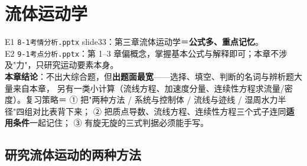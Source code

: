 \chapter{流体运动学}

\begin{yijubox}
E1 \texttt{8-1考情分析.pptx} slide33：第三章流体运动学＝\textbf{公式多、重点记忆}。\\
E2 \texttt{9-1考点分析.pptx}：第 1--3 章偏概念，掌握基本公式与解释即可；本章不涉及"力"，只研究运动要素本身。\\
\textbf{本章结论}：不出大综合题，但\textbf{出题面最宽}——选择、填空、判断的名词与辨析题大量来自本章，
另有一类小计算（流线方程、加速度分量、连续性方程求流量/密度）。复习策略＝
① 把"两种方法 / 系统与控制体 / 流线与迹线 / 湿周水力半径"四组对比表背下来；
② 把质点导数、流线方程、连续性方程三个式子连同\textbf{适用条件}一起记住；
③ 有旋无旋的三式判据必须能手写。
\end{yijubox}

\section{研究流体运动的两种方法}

